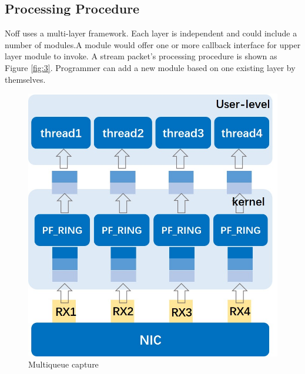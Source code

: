 \documentclass[conference]{IEEEtran}
\begin{document}
\subsection{Processing Procedure}
Noff uses a multi-layer framework. Each layer is independent and could include a number of modules.A module would offer one or more callback interface for upper layer module to invoke. A stream packet's processing procedure is shown as Figure \ref{fig:3}.
Programmer can add a new module based on one existing layer by themselves.
\begin{figure}
\begin{minipage}[t]{0.495\linewidth}
\flushleft
\includegraphics[width=\textwidth]{./picture/Figure1.jpg}
\caption{Multiqueue capture} 
\label{fig:1}
\end{minipage}
\begin{minipage}[t]{0.495\linewidth}
\flushright

\end{minipage}
\end{figure}
\end{document}
